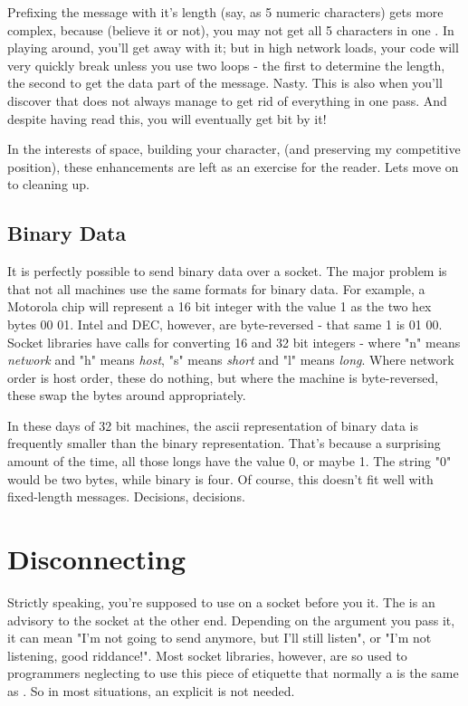 \documentclass{howto}
\begin{document}
Prefixing the message with it's length (say, as 5 numeric characters)
gets more complex, because (believe it or not), you may not get all 5
characters in one . In playing around, you'll get
away with it; but in high network loads, your code will very quickly
break unless you use two  loops - the first to
determine the length, the second to get the data part of the
message. Nasty. This is also when you'll discover that
 does not always manage to get rid of everything in
one pass. And despite having read this, you will eventually get bit by
it!

In the interests of space, building your character, (and preserving my
competitive position), these enhancements are left as an exercise for
the reader. Lets move on to cleaning up.

\subsection{Binary Data}

It is perfectly possible to send binary data over a socket. The major
problem is that not all machines use the same formats for binary
data. For example, a Motorola chip will represent a 16 bit integer
with the value 1 as the two hex bytes 00 01. Intel and DEC, however,
are byte-reversed - that same 1 is 01 00. Socket libraries have calls
for converting 16 and 32 bit integers -  where "n" means \emph{network} and "h" means \emph{host},
"s" means \emph{short} and "l" means \emph{long}. Where network order
is host order, these do nothing, but where the machine is
byte-reversed, these swap the bytes around appropriately.

In these days of 32 bit machines, the ascii representation of binary
data is frequently smaller than the binary representation. That's
because a surprising amount of the time, all those longs have the
value 0, or maybe 1. The string "0" would be two bytes, while binary
is four. Of course, this doesn't fit well with fixed-length
messages. Decisions, decisions.

\section{Disconnecting}

Strictly speaking, you're supposed to use  on a
socket before you  it.  The  is
an advisory to the socket at the other end.  Depending on the argument
you pass it, it can mean "I'm not going to send anymore, but I'll
still listen", or "I'm not listening, good riddance!".  Most socket
libraries, however, are so used to programmers neglecting to use this
piece of etiquette that normally a  is the same as
.  So in most situations, an explicit
 is not needed.
\end{document}
